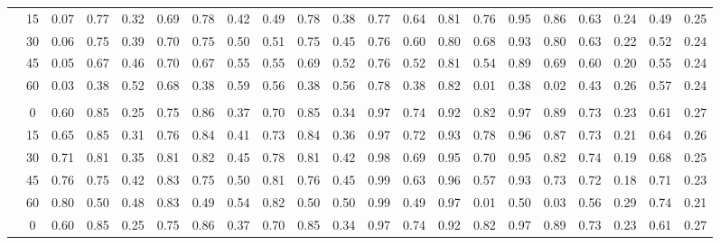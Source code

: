 \begin{table}[h!]
{\begin{tabular}[t]{ccccccccccccccccccccc}
			\hspace{1em} & 15 & 0.07 & 0.77 & 0.32 & 0.69 & 0.78 & 0.42 & 0.49 & 0.78 & 0.38 & 0.77 & 0.64 & 0.81 & 0.76 & 0.95 & 0.86 & 0.63 & 0.24 & 0.49 & 0.25\\
			
			\hspace{1em} & 30 & 0.06 & 0.75 & 0.39 & 0.70 & 0.75 & 0.50 & 0.51 & 0.75 & 0.45 & 0.76 & 0.60 & 0.80 & 0.68 & 0.93 & 0.80 & 0.63 & 0.22 & 0.52 & 0.24\\
			
			\hspace{1em} & 45 & 0.05 & 0.67 & 0.46 & 0.70 & 0.67 & 0.55 & 0.55 & 0.69 & 0.52 & 0.76 & 0.52 & 0.81 & 0.54 & 0.89 & 0.69 & 0.60 & 0.20 & 0.55 & 0.24\\
			
			\hspace{1em}\multirow{-5}{*}{\centering\arraybackslash 0.33} & 60 & 0.03 & 0.38 & 0.52 & 0.68 & 0.38 & 0.59 & 0.56 & 0.38 & 0.56 & 0.78 & 0.38 & 0.82 & 0.01 & 0.38 & 0.02 & 0.43 & 0.26 & 0.57 & 0.24\\
			\cmidrule{1-21}
			\addlinespace[0.3em]
			\multicolumn{21}{l}{\textbf{Selection probabilities for good dose-levels}}\\
			\hspace{1em}\hspace{1em} & 0 & 0.60 & 0.85 & 0.25 & 0.75 & 0.86 & 0.37 & 0.70 & 0.85 & 0.34 & 0.97 & 0.74 & 0.92 & 0.82 & 0.97 & 0.89 & 0.73 & 0.23 & 0.61 & 0.27\\
			
			\hspace{1em} & 15 & 0.65 & 0.85 & 0.31 & 0.76 & 0.84 & 0.41 & 0.73 & 0.84 & 0.36 & 0.97 & 0.72 & 0.93 & 0.78 & 0.96 & 0.87 & 0.73 & 0.21 & 0.64 & 0.26\\
			
			\hspace{1em} & 30 & 0.71 & 0.81 & 0.35 & 0.81 & 0.82 & 0.45 & 0.78 & 0.81 & 0.42 & 0.98 & 0.69 & 0.95 & 0.70 & 0.95 & 0.82 & 0.74 & 0.19 & 0.68 & 0.25\\
			
			\hspace{1em} & 45 & 0.76 & 0.75 & 0.42 & 0.83 & 0.75 & 0.50 & 0.81 & 0.76 & 0.45 & 0.99 & 0.63 & 0.96 & 0.57 & 0.93 & 0.73 & 0.72 & 0.18 & 0.71 & 0.23\\
			
			\hspace{1em}\multirow{-5}{*}{\centering\arraybackslash 0.20} & 60 & 0.80 & 0.50 & 0.48 & 0.83 & 0.49 & 0.54 & 0.82 & 0.50 & 0.50 & 0.99 & 0.49 & 0.97 & 0.01 & 0.50 & 0.03 & 0.56 & 0.29 & 0.74 & 0.21\\
			\cmidrule{1-21}
			& 0 & 0.60 & 0.85 & 0.25 & 0.75 & 0.86 & 0.37 & 0.70 & 0.85 & 0.34 & 0.97 & 0.74 & 0.92 & 0.82 & 0.97 & 0.89 & 0.73 & 0.23 & 0.61 & 0.27\\
			

\end{tabular}}
\end{table}
